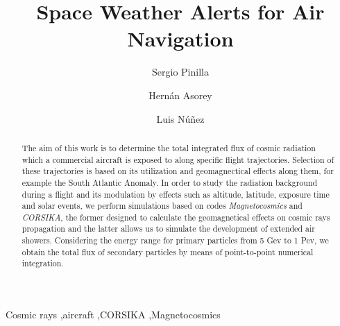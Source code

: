 \documentclass[3p,times,twocolumn]{elsarticle}
\begin{document}
\begin{frontmatter}



\dochead{}

\title{Space Weather Alerts for Air Navigation}


\author[UIS]{Sergio Pinilla}
\author[UIS,CAB]{Hern\'an Asorey}
\author[UIS]{Luis N\'u\~nez}

\address[UIS]{Escuela de f\'isica, Universidad Industrial de Santander, Bucaramanga, Colombia}
\address[CAB]{DPRLab, Centro At\'omico Bariloche \& Instituto Balseiro, Bariloche, Argentina}

\begin{abstract}
The aim of this work is to determine the total integrated flux of cosmic radiation which a commercial aircraft is exposed to along specific flight trajectories. Selection of these trajectories is based on its utilization and geomagnectical effects along them, for example the South Atlantic Anomaly. In order to study the radiation background during a flight and its modulation by effects such as altitude, latitude, exposure time and solar events, we perform simulations  based on codes \textit{Magnetocosmics} and \textit{CORSIKA}, the former designed to calculate the geomagnetical effects on cosmic rays propagation and the latter allows us to simulate the development of extended air showers. Considering the energy range for primary particles from 5 Gev to 1 Pev, we obtain the total flux of secondary particles by means of point-to-point numerical integration.
\end{abstract}

\begin{keyword}
Cosmic rays \sep aircraft \sep CORSIKA \sep Magnetocosmics
\end{keyword}

\end{frontmatter}
\end{document}
